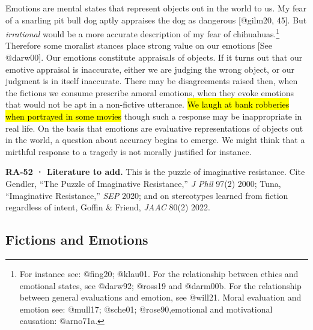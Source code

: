 \documentclass[
  letterpaper,
  DIV=11,
  numbers=noendperiod]{scrartcl}
\theoremstyle{remark}
\begin{document}
Emotions are mental states that represent objects out in the world to
us. My fear of a snarling pit bull dog aptly appraises the dog as
dangerous {[}@gilm20, 45{]}. But \emph{irrational} would be a more
accurate description of my fear of chihuahuas.\footnote{For instance
  see: @fing20; @klau01. For the relationship between ethics and
  emotional states, see @darw92; @ross19 and @darm00b. For the
  relationship between general evaluations and emotion, see @will21.
  Moral evaluation and emotion see: @mull17; @sche01; @rose90,emotional
  and motivational causation: @arno71a.} Therefore some moralist stances
place strong value on our emotions {[}See @darw00{]}. Our emotions
constitute appraisals of objects. If it turns out that our emotive
appraisal is inaccurate, either we are judging the wrong object, or our
judgment is in itself inaccurate. There may be disagreements raised
then, when the fictions we consume prescribe amoral emotions, when they
evoke emotions that would not be apt in a non-fictive utterance. \hl{We
laugh at bank robberies when portrayed in some movies} though such a
response may be inappropriate in real life. On the basis that emotions
are evaluative representations of objects out in the world, a question
about accuracy begins to emerge. We might think that a mirthful response
to a tragedy is not morally justified for instance.

\begin{tcolorbox}[enhanced jigsaw, arc=.35mm, bottomrule=.15mm, bottomtitle=1mm, breakable, colback=white, colbacktitle=quarto-callout-tip-color!10!white, colframe=quarto-callout-tip-color-frame, coltitle=black, left=2mm, leftrule=.75mm, opacityback=0, opacitybacktitle=0.6, rightrule=.15mm, title=\textcolor{quarto-callout-tip-color}{\faLightbulb}\hspace{0.5em}{Tip}, titlerule=0mm, toprule=.15mm, toptitle=1mm]

\textbf{RA-52 · Literature to add.} This is the puzzle of imaginative
resistance. Cite Gendler, ``The Puzzle of Imaginative Resistance,''
\emph{J Phil} 97(2) 2000; Tuna, ``Imaginative Resistance,'' \emph{SEP}
2020; and on stereotypes learned from fiction regardless of intent,
Goffin \& Friend, \emph{JAAC} 80(2) 2022.

\end{tcolorbox}

\subsection{Fictions and Emotions}\label{fictions-and-emotions}
\end{document}
